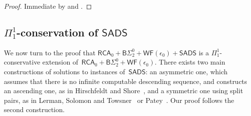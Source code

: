 \documentclass{article}
\newtheorem{theorem}{Theorem}
\numberwithin{theorem}{section}
\newcommand{\quentin}[1]{\textcolor{green}{#1}}
\newcommand{\RCA}{\mathsf{RCA}}
\newcommand{\SEM}{\mathsf{SEM}}
\newcommand{\SADS}{\mathsf{SADS}}
\newcommand{\BSig}{\mathsf{B}\Sigma^0}
\newcommand{\WF}{\mathsf{WF}}
\newcommand{\M}{\mathcal{M}}
\begin{document}

\begin{proof}
Immediate by  and .
\end{proof}








\subsection{$\Pi^1_1$-conservation of $\SADS$}

We now turn to the proof that $\RCA_0 + \BSig_2 + \WF(\epsilon_0) + \SADS$ is a $\Pi^1_1$-conservative extension of~$\RCA_0 + \BSig_2 + \WF(\epsilon_0)$.
There exists two main constructions of solutions to instances of~$\SADS$: an asymmetric one, which assumes that there is no infinite computable descending sequence, and constructs an ascending one, as in Hirschfeldt and Shore~\cite[Theorem 2.11]{Hirschfeldt2007CombinatorialPW}, and a symmetric one using split pairs, as in Lerman, Solomon and Towsner~\cite{lerman2013separating} or Patey~\cite[Theorem 26]{patey2018partial}. Our proof follows the second construction. 
\end{document}
